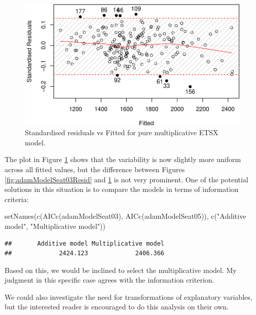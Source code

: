 \documentclass[
]{book}
\newenvironment{Shaded}{\begin{snugshade}}{\end{snugshade}}
\newcommand{\FunctionTok}[1]{\textcolor[rgb]{0.00,0.00,0.00}{#1}}
\newcommand{\NormalTok}[1]{#1}
\newcommand{\StringTok}[1]{\textcolor[rgb]{0.31,0.60,0.02}{#1}}
\theoremstyle{definition}
\theoremstyle{definition}
\theoremstyle{definition}
\theoremstyle{definition}
\theoremstyle{remark}
\begin{document}
\begin{figure}
\centering
\includegraphics{Svetunkov--2022----ADAM_files/figure-latex/adamModelSeat05Resid-1.pdf}
\caption{\label{fig:adamModelSeat05Resid}Standardised residuals vs Fitted for pure multiplicative ETSX model.}
\end{figure}

The plot in Figure \ref{fig:adamModelSeat05Resid} shows that the variability is now slightly more uniform across all fitted values, but the difference between Figures \ref{fig:adamModelSeat03Resid} and \ref{fig:adamModelSeat05Resid} is not very prominent. One of the potential solutions in this situation is to compare the models in terms of information criteria:

\begin{Shaded}
\begin{Highlighting}[]
\FunctionTok{setNames}\NormalTok{(}\FunctionTok{c}\NormalTok{(}\FunctionTok{AICc}\NormalTok{(adamModelSeat03), }\FunctionTok{AICc}\NormalTok{(adamModelSeat05)),}
         \FunctionTok{c}\NormalTok{(}\StringTok{"Additive model"}\NormalTok{, }\StringTok{"Multiplicative model"}\NormalTok{))}
\end{Highlighting}
\end{Shaded}

\begin{verbatim}
##       Additive model Multiplicative model 
##             2424.123             2406.366
\end{verbatim}

Based on this, we would be inclined to select the multiplicative model. My judgment in this specific case agrees with the information criterion.

We could also investigate the need for transformations of explanatory variables, but the interested reader is encouraged to do this analysis on their own.
\end{document}
